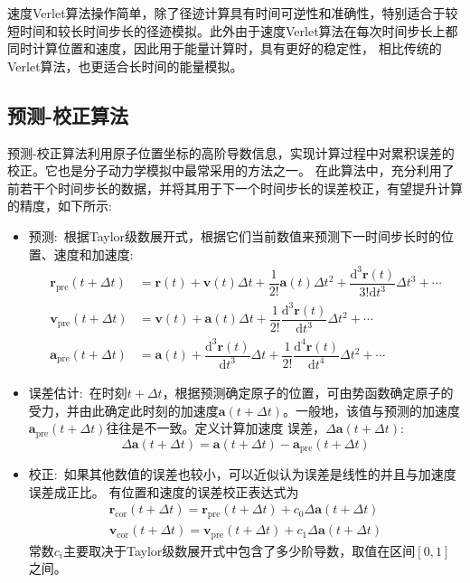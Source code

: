 速度\textrm{Verlet}算法操作简单，除了径迹计算具有时间可逆性和准确性，特别适合于较短时间和较长时间步长的径迹模拟。此外由于速度\textrm{Verlet}算法在每次时间步长上都同时计算位置和速度，因此用于能量计算时，具有更好的稳定性，%
相比传统的\textrm{Verlet}算法，也更适合长时间的能量模拟。
\subsection{预测-校正算法}
预测-校正算法\cite{PR136-405_1964}利用原子位置坐标的高阶导数信息，实现计算过程中对累积误差的校正。它也是分子动力学模拟中最常采用的方法之一。
在此算法中，充分利用了前若干个时间步长的数据，并将其用于下一个时间步长的误差校正，有望提升计算的精度，如下所示:
\begin{itemize}
	\item 预测:~根据\textrm{Taylor}级数展开式，根据它们当前数值来预测下一时间步长时的位置、速度和加速度:
		\begin{equation}
			\begin{aligned}
			\mathbf{r}_{\mathrm{pre}}(t+\Delta t)&=\mathbf{r}(t)+\mathbf{v}(t)\Delta t+\dfrac1{2!}\mathbf{a}(t)\Delta t^2+\dfrac{\mathrm{d}^3\mathbf{r}(t)}{3!\mathrm{d}t^3}\Delta t^3+\cdots\\
			\mathbf{v}_{\mathrm{pre}}(t+\Delta t)&=\mathbf{v}(t)+\mathbf{a}(t)\Delta t+\dfrac1{2!}\dfrac{\mathrm{d}^3\mathbf{r}(t)}{\mathrm{d}t^3}\Delta t^2+\cdots\\
			\mathbf{a}_{\mathrm{pre}}(t+\Delta t)&=\mathbf{a}(t)+\dfrac{\mathrm{d}^3\mathbf{r}(t)}{\mathrm{d}t^3}\Delta t+\dfrac1{2!}\dfrac{\mathrm{d}^4\mathbf{r}(t)}{\mathrm{d}t^4}\Delta t^2+\cdots
			\end{aligned}
			\label{eq:Predict}
		\end{equation}
	\item 误差估计:~在时刻$t+\Delta t$，根据预测确定原子的位置，可由势函数确定原子的受力，并由此确定此时刻的加速度$\mathbf{a}(t+\Delta t)$。一般地，该值与预测的加速度$\mathbf{a}_{\mathrm{pre}}(t+\Delta t)$往往是不一致。定义计算加速度%
		误差，$\Delta\mathbf{a}(t+\Delta t)$:
		\begin{equation}
			\Delta\mathbf{a}(t+\Delta t)=\mathbf{a}(t+\Delta t)-\mathbf{a}_{\mathrm{pre}}(t+\Delta t)
			\label{eq:Delta_a}
		\end{equation}
	\item 校正:~如果其他数值的误差也较小，可以近似认为误差是线性的并且与加速度误差成正比。%
		有位置和速度的误差校正表达式为
		\begin{equation}
			\begin{aligned}
				\mathbf{r}_{\mathrm{cor}}(t+\Delta t)=\mathbf{r}_{\mathrm{pre}}(t+\Delta t)+c_0\Delta\mathbf{a}(t+\Delta t)\\
				\mathbf{v}_{\mathrm{cor}}(t+\Delta t)=\mathbf{v}_{\mathrm{pre}}(t+\Delta t)+c_1\Delta\mathbf{a}(t+\Delta t)
			\end{aligned}
			\label{eq:Correct}
		\end{equation}
		常数$c_i$主要取决于\textrm{Taylor}级数展开式中包含了多少阶导数，取值在区间$[0,1]$之间。%
\end{itemize}
